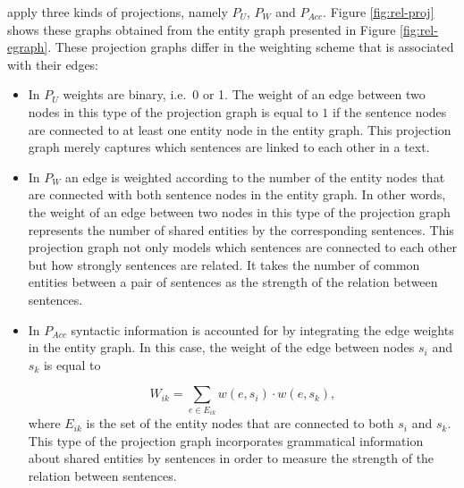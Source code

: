  apply three kinds of projections, namely $P_U$, $P_W$ and $P_{Acc}$. 
Figure \ref{fig:rel-proj} shows these graphs obtained from the entity graph presented in Figure \ref{fig:rel-egraph}. 
These projection graphs differ in the weighting scheme that is associated with their edges: 

\begin{itemize}

	\item In $P_U$ weights are binary, i.e.\ 0 or 1. 
	The weight of an edge between two nodes in this type of the projection graph is equal to $1$ if the sentence nodes are connected to at least one entity node in the entity graph.  
	This projection graph merely captures which sentences are linked to each other in a text. 

	\item In $P_W$ an edge is weighted according to the number of the entity nodes that are connected with both sentence nodes in the entity graph. 
	In other words, the weight of an edge between two nodes in this type of the projection graph represents the number of shared entities by the corresponding sentences. 
	This projection graph not only models which sentences are connected to each other but how strongly  sentences are related. 
	It takes the number of common entities between a pair of sentences as the strength of the relation between sentences. 

	\item In $P_{Acc}$ syntactic information is accounted for by integrating the edge weights in the entity graph. 
	In this case, the weight of the edge between nodes $s_i$ and $s_k$ is equal to

	\begin{equation}
		W_{ik} = \sum_{e \in E_{ik}}{w(e,s_i) \cdot w(e,s_k)},
	\end{equation}
	where $E_{ik}$ is the set of the entity nodes that are connected to both $s_i$ and $s_k$. 
	This type of the projection graph incorporates grammatical information about shared entities by sentences in order to measure the strength of the relation between sentences. 

\end{itemize}


